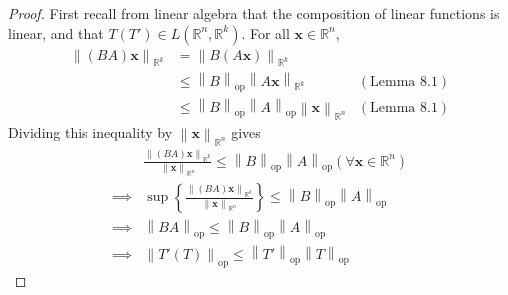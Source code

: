 \documentclass{article}
\newcommand{\R}{\mathbb{R}}
\newcommand{\x}{\mathbf{x}}
\newcommand{\norm}[1]{\left\lVert#1\right\rVert}
\newcommand{\normop}[1]{\left\lVert#1\right\rVert_\text{op}}
\theoremstyle{definition}
\begin{document}
\begin{proof}
	First recall from linear algebra that the composition of linear functions is linear, and that $ T(T')\in L(\R^n,\R^k) $.  For all $ \x\in \R^n $,  
	\begin{align*}
		\norm{(BA)\x}_{\R^k} &= \norm{B(A\x)}_{\R^k} \\ 
		&  \le \normop{B} \norm{A\x}_{\R^k} & (\text{Lemma }8.1) \\ 
		& \le \normop{B}\normop{A}\norm{\x}_{\R^n} & (\text{Lemma }8.1)
	\end{align*}
Dividing this inequality by $ \norm{\x}_{\R^n} $ gives
\begin{align*}
	&\frac{\norm{(BA)\x}_{\R^k}}{ \norm{\x}_{\R^n}}   \le \normop{B}\normop{A} (\forall\x\in\R^n)  \\\implies & \sup\left\{\frac{\norm{(BA)\x}_{\R^k}}{ \norm{\x}_{\R^n}}\right\} \le \normop{B}\normop{A} \\ 
	\implies& \normop{BA} \le \normop{B}\normop{A} \\
	\implies &\normop{T'(T)} \le \normop{T'}\normop{T}
\end{align*}
\end{proof}
\end{document}
